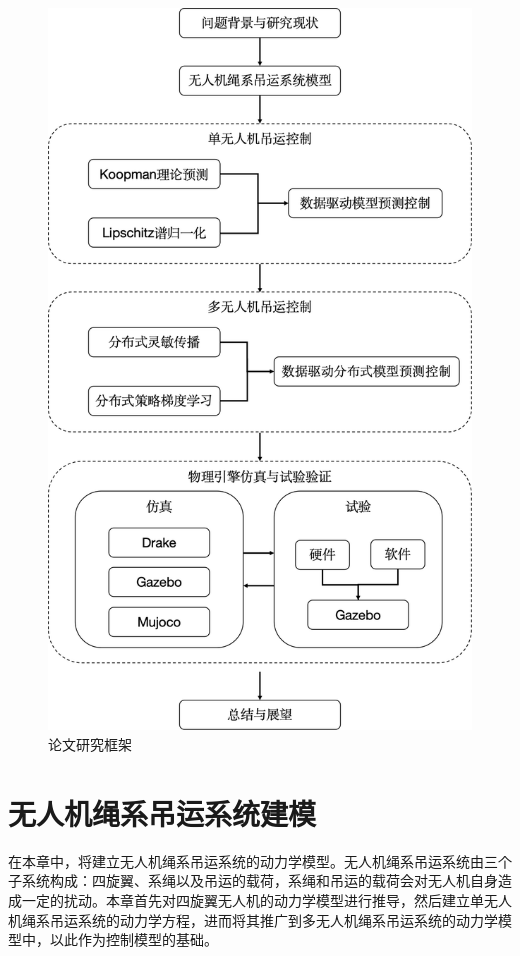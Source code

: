 \documentclass[lang=chs, degree=master, blindreview=false, winfonts=true]{yanputhesis}
\begin{document}
\begin{figure}[hbt!]
	\centering
	\includegraphics[width=28pc]{picture/1_0.png} 
	\caption{论文研究框架} \label{1_0}
\end{figure}

\cleardoublepage

\chapter{无人机绳系吊运系统建模}
在本章中，将建立无人机绳系吊运系统的动力学模型。无人机绳系吊运系统由三个子系统构成：四旋翼、系绳以及吊运的载荷，系绳和吊运的载荷会对无人机自身造成一定的扰动。本章首先对四旋翼无人机的动力学模型进行推导，然后建立单无人机绳系吊运系统的动力学方程，进而将其推广到多无人机绳系吊运系统的动力学模型中，以此作为控制模型的基础。
\end{document}

